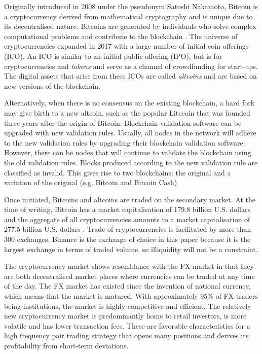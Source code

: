 \documentclass[12pt,english,authoryear]{article}
\begin{document}
Originally introduced in 2008 under the pseudonym Satoshi Nakamoto, Bitcoin is a cryptocurrency derived from mathematical cryptography and is unique due to its decentralised nature. Bitcoins are generated by individuals who solve complex computational problems and contribute to the blockchain \cite{Nakamoto2008}. The universe of cryptocurrencies expanded in 2017 with a large number of initial coin offerings (ICO). An ICO is similar to an initial public offering (IPO), but is for cryptocurrencies and \textit{tokens} and serve as a channel of crowdfunding for start-ups. The digital assets that arise from these ICOs are called \textit{altcoins} and are based on new versions of the blockchain. 

Alternatively, when there is no consensus on the existing blockchain, a hard fork may give birth to a new altcoin, such as the popular Litecoin that was founded three years after the origin of Bitcoin. Blockchain validation software can be upgraded with new validation rules. Usually, all nodes in the network will adhere to the new validation rules by upgrading their blockchain validation software. However, there can be nodes that will continue to validate the blockchain using the old validation rules. Blocks produced according to the new validation rule are classified as invalid. This gives rise to two blockchains: the original and a variation of the original (e.g. Bitcoin and Bitcoin Cash)

Once initiated, Bitcoins and altcoins are traded on the secondary market. At the time of writing, Bitcoin has a market capitalisation of 179.8 billion U.S. dollars and the aggregate of all cryptocurrencies amounts to a market capitalisation of 277.5 billion U.S. dollars \cite{CMC}. Trade of cryptocurrencies is facilitated by more than 300 exchanges. Binance is the exchange of choice in this paper because it is the largest exchange in terms of traded volume, so illiquidity will not be a constraint. 

The cryptocurrency market shows resemblance with the FX market in that they are both decentralised market places where currencies can be traded at any time of the day. The FX market has existed since the invention of national currency, which means that the market is matured. With approximately 95\% of FX traders being institutions, the market is highly competitive and efficient. The relatively new cryptocurrency market is predominantly home to retail investors, is more volatile and has lower transaction fees. These are favorable characteristics for a high frequency pair trading strategy that opens many positions and derives its profitability from short-term deviations.
\end{document}
